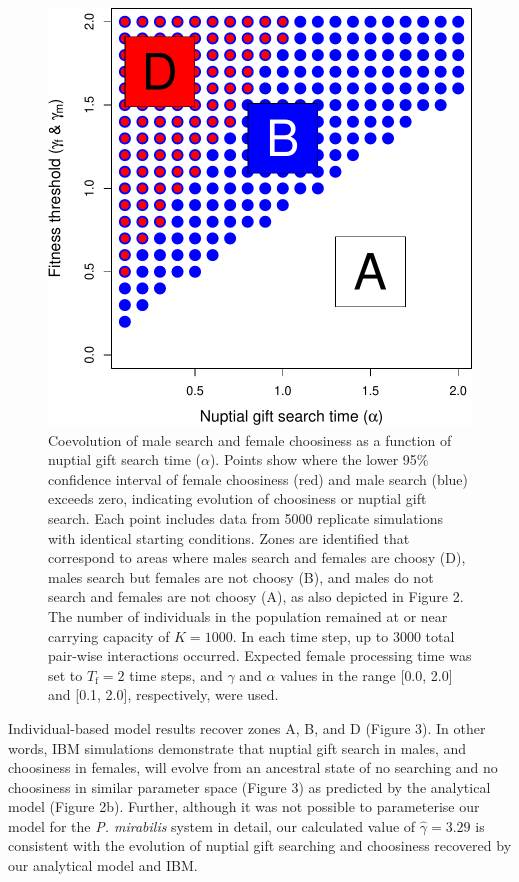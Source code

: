 \documentclass[
]{article}
\begin{document}
\begin{figure}
\centering
\includegraphics{ms_files/figure-latex/unnamed-chunk-4-1.pdf}
\caption{Coevolution of male search and female choosiness as a function
of nuptial gift search time (\(\alpha\)). Points show where the lower
95\% confidence interval of female choosiness (red) and male search
(blue) exceeds zero, indicating evolution of choosiness or nuptial gift
search. Each point includes data from 5000 replicate simulations with
identical starting conditions. Zones are identified that correspond to
areas where males search and females are choosy (D), males search but
females are not choosy (B), and males do not search and females are not
choosy (A), as also depicted in Figure 2. The number of individuals in
the population remained at or near carrying capacity of \(K = 1000\). In
each time step, up to 3000 total pair-wise interactions occurred.
Expected female processing time was set to \(T_{\mathrm{f}}=2\) time
steps, and \(\gamma\) and \(\alpha\) values in the range {[}0.0, 2.0{]}
and {[}0.1, 2.0{]}, respectively, were used.}
\end{figure}

Individual-based model results recover zones A, B, and D (Figure 3). In
other words, IBM simulations demonstrate that nuptial gift search in
males, and choosiness in females, will evolve from an ancestral state of
no searching and no choosiness in similar parameter space (Figure 3) as
predicted by the analytical model (Figure 2b). Further, although it was
not possible to parameterise our model for the \emph{P. mirabilis}
system in detail, our calculated value of \(\hat{\gamma} = 3.29\) is
consistent with the evolution of nuptial gift searching and choosiness
recovered by our analytical model and IBM.
\end{document}

